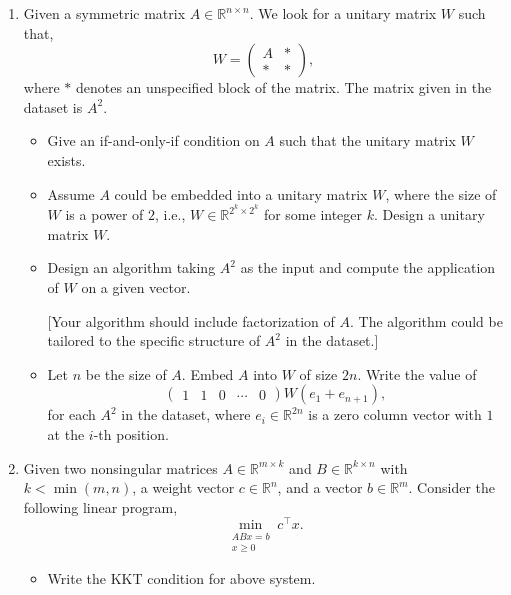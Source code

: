 \begin{enumerate}
    \item[一、]
Given a symmetric matrix $A\in\mathbb{R}^{n\times n}$. We look for a unitary matrix $W$ such that, 
\[
W = \begin{pmatrix}
    A & \ast\\
    \ast & \ast
\end{pmatrix}, 
\] 
where $\ast$ denotes an unspecified block of the matrix. The matrix given in the dataset is $A^2$. 

\begin{itemize}
    \item[(1) (10 pt)] Give an if-and-only-if condition on $A$ such that the unitary matrix $W$ exists.

    \item[(2) (10 pt)] Assume $A$ could be embedded into a unitary matrix $W$, where the size of $W$ is a power of $2$, i.e., $W\in\mathbb{R}^{2^k\times 2^k}$ for some integer $k$. Design a unitary matrix $W$. 

    \item[(3) (20 pt)] Design an algorithm taking $A^2$ as the input and compute the application of $W$ on a given vector. 

    [Your algorithm should include factorization of $A$. The algorithm could be tailored to the specific structure of $A^2$ in the dataset.]

    \item[(4) (10 pt)] Let $n$ be the size of $A$. Embed $A$ into $W$ of size $2n$. Write the value of 
\[
\begin{pmatrix}
    1 & 1 & 0 & \cdots & 0
\end{pmatrix}W(e_1+e_{n+1}), 
\]
for each $A^2$ in the dataset, where $e_i\in\mathbb{R}^{2n}$ is a zero column vector with $1$ at the $i$-th position. 
\end{itemize}
 


\item[二、]Given two nonsingular matrices $A\in\mathbb{R}^{m\times k}$ and $B\in\mathbb{R}^{k\times n}$ with $k<\min(m, n)$, a weight vector $c\in\mathbb{R}^n$, and a vector $b\in\mathbb{R}^m$. Consider the following linear program, 
\[
\min_{\substack{ABx=b \\ x\geq 0}} c^\top x. 
\]

\begin{itemize}
    \item[(1) (10 pt)] Write the KKT condition for above system. 


\end{itemize}
\end{enumerate}
